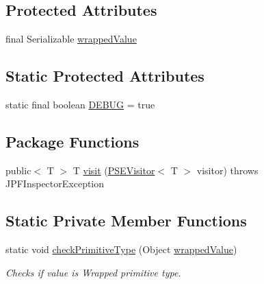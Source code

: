 \subsection*{Protected Attributes}
\begin{DoxyCompactItemize}
\item 
final Serializable \hyperlink{classgov_1_1nasa_1_1jpf_1_1inspector_1_1common_1_1pse_1_1_p_s_e_variable_primitive_a9765da8fdc3fa98de09d90006a715547}{wrapped\+Value}
\end{DoxyCompactItemize}
\subsection*{Static Protected Attributes}
\begin{DoxyCompactItemize}
\item 
static final boolean \hyperlink{classgov_1_1nasa_1_1jpf_1_1inspector_1_1common_1_1pse_1_1_program_state_entry_a84ef5e9f23ec651d7a67a8ee72819b0e}{D\+E\+B\+UG} = true
\end{DoxyCompactItemize}
\subsection*{Package Functions}
\begin{DoxyCompactItemize}
\item 
public$<$ T $>$ T \hyperlink{classgov_1_1nasa_1_1jpf_1_1inspector_1_1common_1_1pse_1_1_p_s_e_variable_primitive_a40624a8d2fb372204636b87eb876777e}{visit} (\hyperlink{interfacegov_1_1nasa_1_1jpf_1_1inspector_1_1common_1_1pse_1_1_p_s_e_visitor}{P\+S\+E\+Visitor}$<$ T $>$ visitor)  throws J\+P\+F\+Inspector\+Exception 
\end{DoxyCompactItemize}
\subsection*{Static Private Member Functions}
\begin{DoxyCompactItemize}
\item 
static void \hyperlink{classgov_1_1nasa_1_1jpf_1_1inspector_1_1common_1_1pse_1_1_p_s_e_variable_primitive_a521ede353956526af73c4fbe65453494}{check\+Primitive\+Type} (Object \hyperlink{classgov_1_1nasa_1_1jpf_1_1inspector_1_1common_1_1pse_1_1_p_s_e_variable_primitive_a9765da8fdc3fa98de09d90006a715547}{wrapped\+Value})
\begin{DoxyCompactList}\small\item\em Checks if value is Wrapped primitive type. \end{DoxyCompactList}\end{DoxyCompactItemize}
